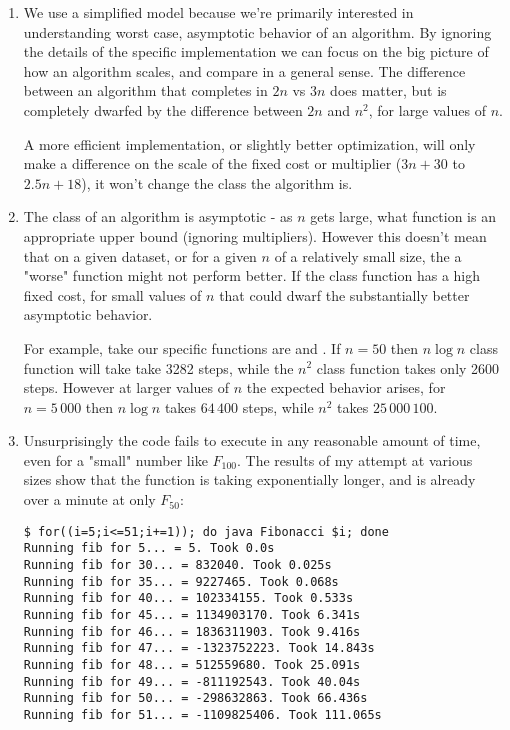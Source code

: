 \documentclass[12pt]{chmullighw}
\begin{document}
\begin{enumerate}

\item We use a simplified model because we're primarily interested in
understanding worst case, asymptotic behavior of an algorithm. By ignoring the
details of the specific implementation we can focus on the big picture of how an
algorithm scales, and compare in a general sense. The difference between an algorithm
that completes in $2n$ vs $3n$ does matter, but is completely dwarfed by the
difference between $2n$ and $n^2$, for large values of $n$. 

A more efficient implementation, or slightly better optimization, will only make
a difference on the scale of the fixed cost or multiplier ($3n+30$ to $2.5n+18$),
it won't change the class the algorithm is.


\item The class of an algorithm is asymptotic - as $n$ gets large, what function
is an appropriate upper bound (ignoring multipliers). However this doesn't mean
that on a given dataset, or for a given $n$ of a relatively small size, the
a "worse" function might not perform better. If the  class function
has a high fixed cost, for small values of $n$ that could dwarf the substantially
better asymptotic behavior. 

For example, take our specific functions are  and
. If $n = 50$ then $n \log n$ class function will take take
3282 steps, while the $n^2$ class function takes only 2600 steps. However at
larger values of $n$ the expected behavior arises, for $n = 5\,000$ then $n \log n$
takes $64\,400$ steps, while $n^2$ takes $25\,000\,100$.


\item


Unsurprisingly the code fails to execute in any reasonable amount of time, even
for a "small" number like $F_{100}$. The results of my attempt at various sizes
show that the function is taking exponentially longer, and is already over a minute
at only $F_{50}$:

\begin{verbatim}
$ for((i=5;i<=51;i+=1)); do java Fibonacci $i; done
Running fib for 5... = 5. Took 0.0s
Running fib for 30... = 832040. Took 0.025s
Running fib for 35... = 9227465. Took 0.068s
Running fib for 40... = 102334155. Took 0.533s
Running fib for 45... = 1134903170. Took 6.341s
Running fib for 46... = 1836311903. Took 9.416s
Running fib for 47... = -1323752223. Took 14.843s
Running fib for 48... = 512559680. Took 25.091s
Running fib for 49... = -811192543. Took 40.04s
Running fib for 50... = -298632863. Took 66.436s
Running fib for 51... = -1109825406. Took 111.065s
\end{verbatim}




\end{enumerate}
\end{document}
